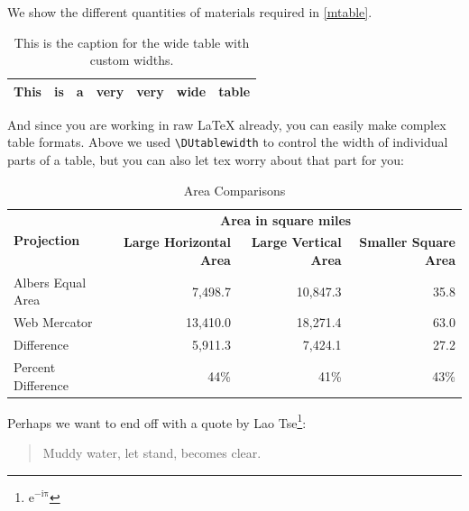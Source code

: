 We show the different quantities of materials required in \autoref{mtable}.


\begin{longtable}[c]{p{}p{}p{}p{}p{}p{}p{}}
    \caption{This is the caption for the wide table with custom widths.\label{wide-table}} \\
    \toprule
    This & is & a & very & very & wide & table \\
    \bottomrule
\end{longtable}

And since you are working in raw LaTeX already, you can easily make complex
table formats. Above we used \verb|\DUtablewidth| to control the width of individual parts of a table, but you can also let tex worry about that part for you:

\begin{longtable}{|l|rrr|}
\caption{Area Comparisons \label{quanitities-table}}\\
\hline
\multirow{2}{*}{\bf Projection} & \multicolumn{3}{c|}{\bf Area in square miles} \\
\cline{2-4}
& \textbf{Large Horizontal Area} & \textbf{Large Vertical Area} & \textbf{Smaller Square Area} \\
\hline
\endfirsthead
Albers Equal Area & 7,498.7 & 10,847.3 & 35.8 \\
Web Mercator & 13,410.0 & 18,271.4 & 63.0 \\
Difference & 5,911.3 & 7,424.1 & 27.2 \\
Percent Difference & 44\% & 41\% & 43\% \\
\hline
\end{longtable}

Perhaps we want to end off with a quote by Lao Tse\footnote{$\mathrm{e^{-i\pi}}$}:

\begin{quote}
    Muddy water, let stand, becomes clear.
\end{quote}



